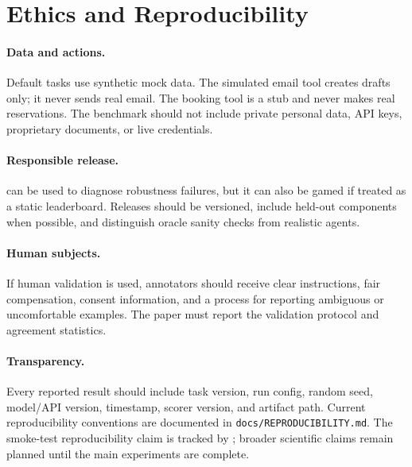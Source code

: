 \section{Ethics and Reproducibility}

\paragraph{Data and actions.}
Default tasks use synthetic mock data. The simulated email tool creates drafts only; it never sends real email. The booking tool is a stub and never makes real reservations. The benchmark should not include private personal data, API keys, proprietary documents, or live credentials.

\paragraph{Responsible release.}
\benchmark can be used to diagnose robustness failures, but it can also be gamed if treated as a static leaderboard. Releases should be versioned, include held-out components when possible, and distinguish oracle sanity checks from realistic agents.

\paragraph{Human subjects.}
If human validation is used, annotators should receive clear instructions, fair compensation, consent information, and a process for reporting ambiguous or uncomfortable examples. The paper must report the validation protocol and agreement statistics.

\paragraph{Transparency.}
Every reported result should include task version, run config, random seed, model/API version, timestamp, scorer version, and artifact path. Current reproducibility conventions are documented in \texttt{docs/REPRODUCIBILITY.md}. The smoke-test reproducibility claim is tracked by ; broader scientific claims remain planned until the main experiments are complete.
